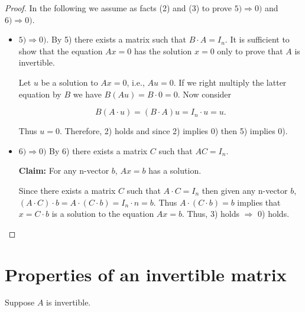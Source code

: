 \documentclass[12pt]{article}
\theoremstyle{definition}
\begin{document}
\begin{proof}
In the following we assume as facts (2) and (3) to prove $5) \Rightarrow 0)$ and
$6) \Rightarrow 0)$.

\begin{itemize}
\item[] \underline{$5) \Rightarrow 0)$}. By 5) there exists a matrix such that $B \cdot A = I_n$. It is 
sufficient to show that the equation $Ax = 0$ has the solution $x = 0$ only to prove that
$A$ is invertible.

Let $u$ be a solution to $Ax = 0$, i.e., $Au = 0$. If we right multiply the latter equation
by $B$ we have $B(Au) = B \cdot 0 = 0$. Now consider

$$B(A\cdot u) = (B \cdot A) u = I_n \cdot u = u.$$

Thus $u = 0$. Therefore, 2) holds and since 2) implies 0) then 5) implies 0).

\item[] \underline{$6) \Rightarrow 0)$} By 6) there exists a matrix $C$ such that $AC = I_n$.

\textbf{Claim:} For any n-vector $b$, $Ax = b$ has a solution.

Since there exists a matrix $C$ such that $A \cdot C = I_n$ then given any n-vector $b$,
$(A \cdot C) \cdot b = A \cdot (C \cdot b) = I_n \cdot n = b$. Thus 
$A \cdot (C \cdot b) = b$ implies that $x = C \cdot b$ is a solution to the equation $Ax = b$.
Thus, 3) holds $\Rightarrow$ 0) holds.
\end{itemize}
\end{proof}

\section{Properties of an invertible matrix}

Suppose $A$ is invertible.
\end{document}
